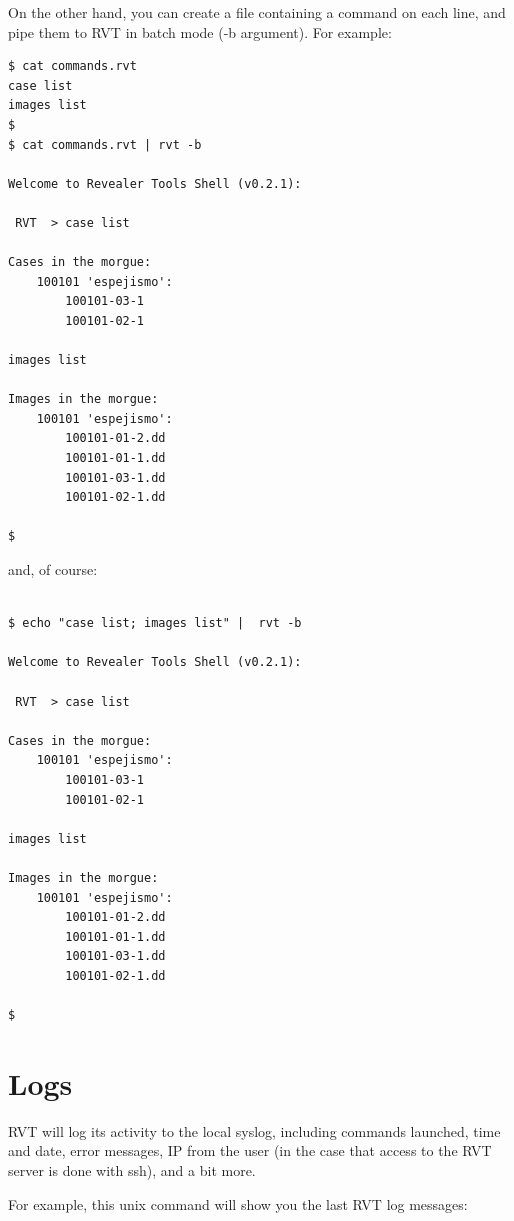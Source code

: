 \documentclass[a4paper,11pt,oneside]{report}
\begin{document}
On the other hand, you can create a file containing a command on each line, and pipe them to RVT in batch mode (-b argument). For example:

\begin{verbatim}
$ cat commands.rvt 
case list
images list
$
$ cat commands.rvt | rvt -b

Welcome to Revealer Tools Shell (v0.2.1):

 RVT  > case list

Cases in the morgue: 
	100101 'espejismo':
		100101-03-1
		100101-02-1

images list

Images in the morgue: 
	100101 'espejismo':
		100101-01-2.dd
		100101-01-1.dd
		100101-03-1.dd
		100101-02-1.dd

$
\end{verbatim}


and, of course:


\begin{verbatim}
 
$ echo "case list; images list" |  rvt -b

Welcome to Revealer Tools Shell (v0.2.1):

 RVT  > case list

Cases in the morgue: 
	100101 'espejismo':
		100101-03-1
		100101-02-1

images list

Images in the morgue: 
	100101 'espejismo':
		100101-01-2.dd
		100101-01-1.dd
		100101-03-1.dd
		100101-02-1.dd

$
\end{verbatim}





\section{Logs}

RVT will log its activity to the local syslog, including commands launched, time and date, error messages, IP from the user (in the case that access to the RVT server is done with ssh), and a bit more.

For example, this unix command will show you the last RVT log messages:
\end{document}
